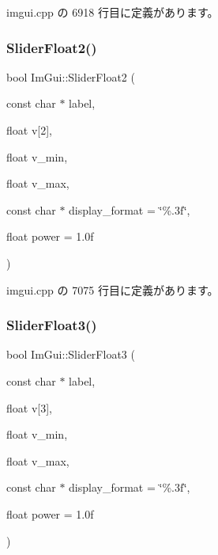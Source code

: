  imgui.\+cpp の 6918 行目に定義があります。

\mbox{\label{namespace_im_gui_a0d5270d08284202523130e8b6ef66350}} 
\subsubsection{\texorpdfstring{Slider\+Float2()}{SliderFloat2()}}
{\footnotesize\ttfamily bool Im\+Gui\+::\+Slider\+Float2 (\begin{DoxyParamCaption}\item[{const char $\ast$}]{label,  }\item[{float}]{v\mbox{[}2\mbox{]},  }\item[{float}]{v\+\_\+min,  }\item[{float}]{v\+\_\+max,  }\item[{const char $\ast$}]{display\+\_\+format = {\ttfamily \char`\"{}\%.3f\char`\"{}},  }\item[{float}]{power = {\ttfamily 1.0f} }\end{DoxyParamCaption})}



 imgui.\+cpp の 7075 行目に定義があります。

\mbox{\label{namespace_im_gui_aab33732d7951627f9c32d708f263889f}} 
\subsubsection{\texorpdfstring{Slider\+Float3()}{SliderFloat3()}}
{\footnotesize\ttfamily bool Im\+Gui\+::\+Slider\+Float3 (\begin{DoxyParamCaption}\item[{const char $\ast$}]{label,  }\item[{float}]{v\mbox{[}3\mbox{]},  }\item[{float}]{v\+\_\+min,  }\item[{float}]{v\+\_\+max,  }\item[{const char $\ast$}]{display\+\_\+format = {\ttfamily \char`\"{}\%.3f\char`\"{}},  }\item[{float}]{power = {\ttfamily 1.0f} }\end{DoxyParamCaption})}



